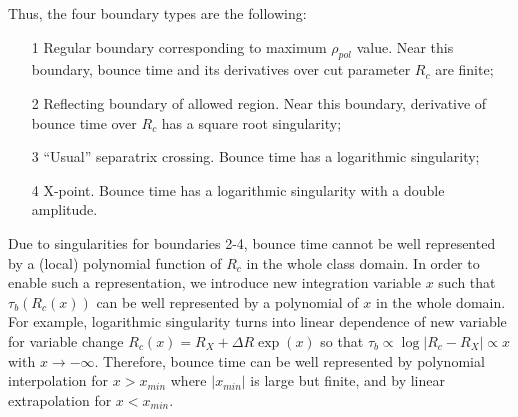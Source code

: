 \documentclass[preprint,prb,aps]{revtex4-1}
\begin{document}
Thus, the four boundary types are the following:
\begin{itemize}
\item[1] Regular boundary corresponding to maximum $\rho_{pol}$ value. Near this 
boundary, bounce time and its derivatives over cut parameter $R_c$ are finite;
\item[2] Reflecting boundary of allowed region. Near this boundary, derivative
of bounce time over $R_c$ has a square root singularity;
\item[3] ``Usual'' separatrix crossing. Bounce time has a logarithmic singularity;
\item[4] X-point. Bounce time has a logarithmic singularity with a double amplitude.
\end{itemize}
Due to singularities for boundaries 2-4, bounce time cannot be well represented
by a (local) 
polynomial function of $R_c$ in the whole class domain. In order to enable 
such a representation, we introduce new integration variable $x$ such that
$\tau_b(R_c(x))$ can be well represented by a polynomial of $x$ in the whole domain.
For example, logarithmic singularity turns into linear dependence of new variable
for variable change $R_c(x) = R_X + \Delta R \exp(x)$ so that
$\tau_b \propto \log|R_c-R_X| \propto x$ with $x\rightarrow - \infty$.
Therefore, bounce time can be well represented by polynomial interpolation for
$x>x_{min}$ where $|x_{min}|$ is large but finite, and by linear extrapolation
for $x<x_{min}$.
\end{document}
